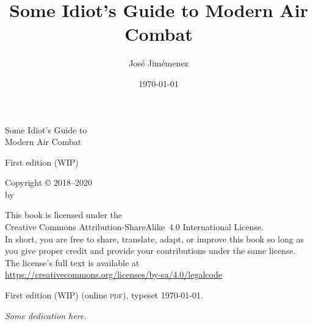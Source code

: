\documentclass[fontsize=10bp, numbers=endperiod, draft=true]{scrbook}
\title{Some Idiot's Guide to Modern Air Combat}
\author{José Jimémenez}
\date{\today}
\makeatletter
\newcommand{\edition}{First edition \acronym{(WIP)}}
\newcommand{\acronym}[1]{\textsc{#1}}
\newcommand{\https}[1]{\url{https://#1}}
\let\runauthor\@author
\renewcommand{\cleardoublepage}{\clearpage}
\makeatother
\begin{document}
\fontsize{10bp}{12bp}\selectfont

\frontmatter
\setcounter{secnumdepth}{0}
\setlength\parindent{0pt}

{}
\vspace*{1in}
\begin{center}
\sffamily
\fontsize{0.25in}{0.3in}\selectfont
Some Idiot's Guide to \\
\fontsize{0.5in}{0.6in}\selectfont
Modern Air Combat

\normalsize
\vspace{1.5\baselineskip}
\edition
\vspace{2in}

\LARGE
\runauthor
\end{center}
\clearpage

{\raggedright%
\null
\vfill

Copyright © 2018--2020 \\
by \runauthor
\bigskip

This book is licensed under the \\
{Creative Commons Attribution-ShareAlike~4.0}
International License. \\
In short, you are free to share, translate, adapt, or improve this book
so long as you give proper credit and provide your contributions under
the same license. \\
The license's full text is available at \\
\https{creativecommons.org/licenses/by-sa/4.0/legalcode}

\vspace{0.5in}
\edition{} (online \acronym{pdf}), typeset \today.
} %
\clearpage

\vspace*{1in}
{\itshape%
Some dedication here.
}
\cleardoublepage

\tableofcontents

\mainmatter
\setlength\parindent{14bp}

\setcounter{page}{1} %
\cleardoublepage




\end{document}
